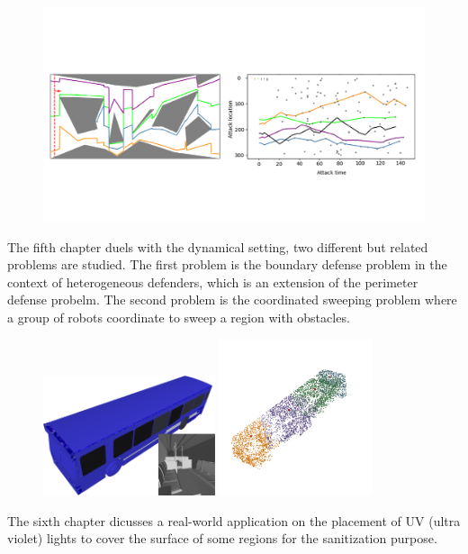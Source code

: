 \begin{figure}[ht]
    \centering
    \vspace{-.8in}
    \includegraphics[width=.8\textwidth]{figures/dynamic-intro.png}
    \vspace{-.8in}
    \label{fig:intro-bd-sc}
\end{figure}
The fifth chapter duels with the dynamical setting, two different but related problems are studied. 
The first problem is the boundary defense problem in the context of heterogeneous defenders, 
which is an extension of the perimeter defense probelm. 
The second problem is the coordinated sweeping problem where a group of robots coordinate to sweep a region with obstacles. 

\begin{figure}[ht]
    \centering
    \includegraphics[width = 0.45\textwidth]{chapters/surf/fig/bus.png}
    \hfill
    \includegraphics[width = 0.4\textwidth]{chapters/surf/fig/bus_result_3.png}
    \label{fig:intro-surf}
\end{figure}
The sixth chapter dicusses a real-world application on the placement of UV (ultra violet) lights 
to cover the surface of some regions for the sanitization purpose. 

